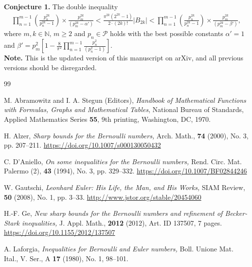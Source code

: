 \documentclass[eqnumis, pdf]{yjb}
\begin{document}
{{\bf Conjecture 1.}\label{conj1}
The double inequality
\begin{align*}
 \prod_{n=1}^{m-1} \left(\frac{p_n^{2k}}{p_n^{2k}-1}\right) \times  \frac{p_m^{2k}}{(p_m^{2k} - \alpha')}  < \frac{\pi^{2k} (2^{2k}-1)}{2\cdot (2k)!} \vert B_{2k} \vert 
<  \prod_{n=1}^{m-1} \left(\frac{p_n^{2k}}{p_n^{2k}-1}\right) \times  \frac{p_m^{2k}}{(p_m^{2k} - \beta')}, 
\end{align*}
where $m, k \in \mathbb{N}, \, m \geq 2 $ and $p_n \in \mathcal{P}$ holds with the best possible constants  $ \alpha' = 1 $ and $ \beta' = p_m^2\left[1-\frac{8}{\pi^2} \prod_{n=1}^{m-1}\frac{p_n^2}{(p_n^2-1)} \right]. $ \\

{\bf Note.} This is the updated version of this manuscript on arXiv, and all previous versions should be disregarded.


\begin{thebibliography}{99}      
        
         M. Abramowitz and I. A. Stegun (Editors),
         {\em Handbook of Mathematical Functions with Formulas, Graphs and Mathematical Tables}, National Bureau of Standards, Applied Mathematics Series {\bf 55}, 9th printing, Washington, DC, 1970.
         
        H. Alzer,
        {\em Sharp bounds for the Bernoulli numbers,}  Arch. Math., {\bf 74} (2000), No. 3, pp. 207--211. \url{https://doi.org/10.1007/s000130050432}           
         
        C. D'Aniello,
        {\em On some inequalities for the Bernoulli numbers,} Rend. Circ. Mat. Palermo (2), {\bf 43} (1994), No. 3, pp. 329--332. \url{https://doi.org/10.1007/BF02844246}        

        W. Gautschi,
        {\em Leonhard Euler: His Life, the Man, and His Works,} SIAM Review, {\bf 50} (2008), No. 1, pp. 3--33. \url{http://www.jstor.org/stable/20454060}  

        H.-F. Ge,
        {\em New sharp bounds for the Bernoulli numbers and refinement of Becker-Stark inequalities,} J. Appl. Math., {\bf 2012} (2012), Art. ID 137507, 7 pages. \url{https://doi.org/10.1155/2012/137507}               
        
       A. Laforgia, 
       {\em Inequalities for Bernoulli and Euler numbers,} Boll. Unione Mat. Ital., V. Ser., A {\bf 17} (1980), No. 1, 98--101.        
        

\end{thebibliography}}
\end{document}

